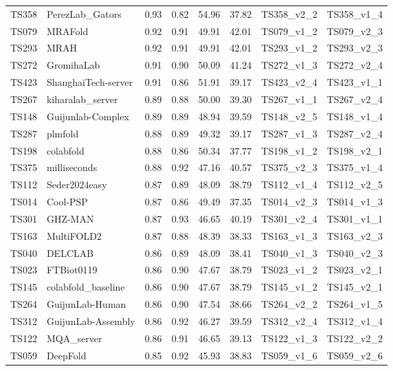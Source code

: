 \begin{longtable}{llllllll}
TS358 & PerezLab\_Gators & 0.93 & 0.82 & 54.96 & 37.82 & TS358\_v2\_2 & TS358\_v1\_4 \\ 
TS079 & MRAFold & 0.92 & 0.91 & 49.91 & 42.01 & TS079\_v1\_2 & TS079\_v2\_3 \\ 
TS293 & MRAH & 0.92 & 0.91 & 49.91 & 42.01 & TS293\_v1\_2 & TS293\_v2\_3 \\ 
TS272 & GromihaLab & 0.91 & 0.90 & 50.09 & 41.24 & TS272\_v1\_3 & TS272\_v2\_4 \\ 
TS423 & ShanghaiTech-server & 0.91 & 0.86 & 51.91 & 39.17 & TS423\_v2\_4 & TS423\_v1\_1 \\ 
TS267 & kiharalab\_server & 0.89 & 0.88 & 50.00 & 39.30 & TS267\_v1\_1 & TS267\_v2\_4 \\ 
TS148 & Guijunlab-Complex & 0.89 & 0.89 & 48.94 & 39.59 & TS148\_v2\_5 & TS148\_v1\_4 \\ 
TS287 & plmfold & 0.88 & 0.89 & 49.32 & 39.17 & TS287\_v1\_3 & TS287\_v2\_4 \\ 
TS198 & colabfold & 0.88 & 0.86 & 50.34 & 37.77 & TS198\_v1\_2 & TS198\_v2\_1 \\ 
TS375 & milliseconds & 0.88 & 0.92 & 47.16 & 40.57 & TS375\_v2\_3 & TS375\_v1\_4 \\ 
TS112 & Seder2024easy & 0.87 & 0.89 & 48.09 & 38.79 & TS112\_v1\_4 & TS112\_v2\_5 \\ 
TS014 & Cool-PSP & 0.87 & 0.86 & 49.49 & 37.35 & TS014\_v2\_3 & TS014\_v1\_3 \\ 
TS301 & GHZ-MAN & 0.87 & 0.93 & 46.65 & 40.19 & TS301\_v2\_4 & TS301\_v1\_1 \\ 
TS163 & MultiFOLD2 & 0.87 & 0.88 & 48.39 & 38.33 & TS163\_v1\_3 & TS163\_v2\_3 \\ 
TS040 & DELCLAB & 0.86 & 0.89 & 48.09 & 38.41 & TS040\_v1\_3 & TS040\_v2\_3 \\ 
TS023 & FTBiot0119 & 0.86 & 0.90 & 47.67 & 38.79 & TS023\_v1\_2 & TS023\_v2\_1 \\ 
TS145 & colabfold\_baseline & 0.86 & 0.90 & 47.67 & 38.79 & TS145\_v1\_2 & TS145\_v2\_1 \\ 
TS264 & GuijunLab-Human & 0.86 & 0.90 & 47.54 & 38.66 & TS264\_v2\_2 & TS264\_v1\_5 \\ 
TS312 & GuijunLab-Assembly & 0.86 & 0.92 & 46.27 & 39.59 & TS312\_v2\_4 & TS312\_v1\_4 \\ 
TS122 & MQA\_server & 0.86 & 0.91 & 46.65 & 39.13 & TS122\_v1\_3 & TS122\_v2\_2 \\ 
TS059 & DeepFold & 0.85 & 0.92 & 45.93 & 38.83 & TS059\_v1\_6 & TS059\_v2\_6 \\ 

\end{longtable}
